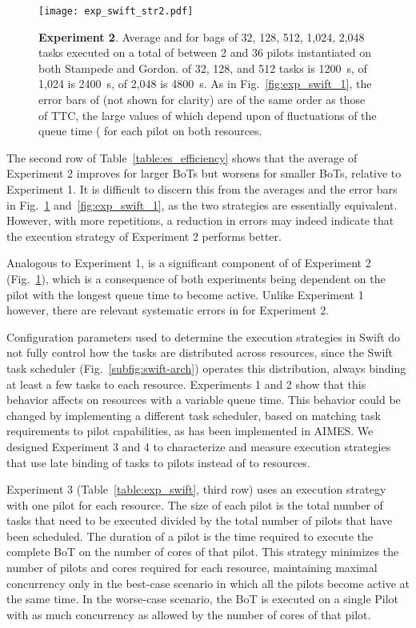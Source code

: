 \documentclass[10pt, conference, compsocconf]{IEEEtran}
\newcommand{\B}[1]{\textbf{#1}\xspace}
\begin{document}
\begin{figure}
  \centering
  \texttt{[image: exp\_swift\_str2.pdf]}
  \caption{ \B{Experiment 2}. Average  and  for bags of 32, 128,
            512, 1,024, 2,048 tasks executed on a total of between 2 and 36
            pilots instantiated on both Stampede and Gordon.  of 32,
            128, and 512 tasks is 1200~s, of 1,024 is 2400~s, of 2,048 is 4800~s.
            As in Fig.~\ref{fig:exp_swift_1}, the error bars of  (not
            shown for clarity) are of the same order as those of TTC, the
            large values of which depend upon of fluctuations of the queue
            time ( for each pilot on both
            resources.}\label{fig:exp_swift_2}
\end{figure}

The second row of Table~\ref{table:es_efficiency} shows that the average
 of Experiment 2 improves for larger BoTs but worsens for smaller
BoTs, relative to Experiment 1.  It is difficult to discern this from the
 averages and the error bars in Fig.~\ref{fig:exp_swift_2}
and~\ref{fig:exp_swift_1}, as the two strategies are essentially equivalent.
However, with more repetitions, a reduction in errors may indeed indicate
that the execution strategy of Experiment 2 performs better.

Analogous to Experiment 1,  is a significant component of  of
Experiment 2 (Fig.~\ref{fig:exp_swift_2}),  which is a consequence of both
experiments being dependent on the pilot with the longest queue time to
become active. Unlike Experiment 1 however, there are relevant systematic
errors in  for Experiment 2.

Configuration parameters used to determine the execution strategies in Swift do
not fully control how the tasks are distributed across resources, since the
Swift task scheduler (Fig.~\ref{subfig:swift-arch}) operates this distribution,
always binding at least a few tasks to each resource. Experiments 1 and 2 show
that this behavior affects  on resources with a variable queue time. This
behavior could be changed by implementing a different task scheduler, based on
matching task requirements to pilot capabilities, as has been implemented in
AIMES\@. We designed Experiment 3 and 4 to characterize and measure execution
strategies that use late binding of tasks to pilots instead of to resources.

Experiment 3 (Table~\ref{table:exp_swift}, third row) uses an execution
strategy with one pilot for each resource. The size of each pilot is the
total number of tasks that need to be executed divided by the total number of
pilots that have been scheduled. The duration of a pilot is the time required
to execute the complete BoT on the number of cores of that pilot. This
strategy minimizes the number of pilots and cores required for each resource,
maintaining maximal concurrency only in the best-case scenario in which all
the pilots become active at the same time. In the worse-case scenario, the
BoT is executed on a single Pilot with as much concurrency as allowed by the
number of cores of that pilot.
\end{document}
